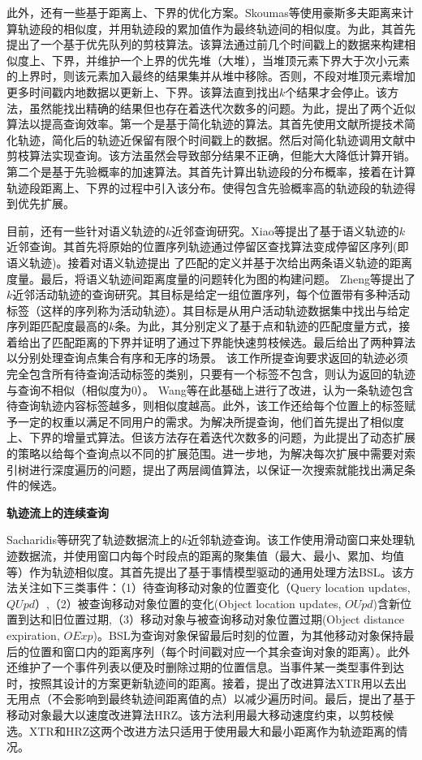 此外，还有一些基于距离上、下界的优化方案。Skoumas等使用豪斯多夫距离来计算轨迹段的相似度，并用轨迹段的累加值作为最终轨迹间的相似度\cite{Skoumas}。为此，其首先提出了一个基于优先队列的剪枝算法。该算法通过前几个时间戳上的数据来构建相似度上、下界，并维护一个上界的优先堆（大堆），当堆顶元素下界大于次小元素的上界时，则该元素加入最终的结果集并从堆中移除。否则，不段对堆顶元素增加更多时间戳内地数据以更新上、下界。该算法直到找出$k$个结果才会停止。该方法，虽然能找出精确的结果但也存在着迭代次数多的问题。为此，提出了两个近似算法以提高查询效率。第一个是基于简化轨迹的算法。其首先使用文献\cite{Zhao1997LINEAR}所提技术简化轨迹，简化后的轨迹近保留有限个时间戳上的数据。然后对简化轨迹调用文献\cite{Skoumas}中剪枝算法实现查询。该方法虽然会导致部分结果不正确，但能大大降低计算开销。第二个是基于先验概率的加速算法。其首先计算出轨迹段的分布概率，接着在计算轨迹段距离上、下界的过程中引入该分布。使得包含先验概率高的轨迹段的轨迹得到优先扩展。


目前，还有一些针对语义轨迹的$k$近邻查询研究\cite{Xiao,Kaiser,WangBCSSQ17}。Xiao等提出了基于语义轨迹的$k$近邻查询\cite{Xiao}。其首先将原始的位置序列轨迹通过停留区查找算法变成停留区序列(即语义轨迹)。接着对语义轨迹提出 了匹配的定义并基于次给出两条语义轨迹的距离度量。最后，将语义轨迹间距离度量的问题转化为图的构建问题。
Zheng等提出了$k$近邻活动轨迹的查询研究。其目标是给定一组位置序列，每个位置带有多种活动标签（这样的序列称为活动轨迹）\cite{Kaiser}。其目标是从用户活动轨迹数据集中找出与给定序列距匹配度最高的$k$条。为此，其分别定义了基于点和轨迹的匹配度量方式，接着给出了匹配距离的下界并证明了通过下界能快速剪枝候选。最后给出了两种算法以分别处理查询点集合有序和无序的场景。
该工作所提查询要求返回的轨迹必须完全包含所有待查询活动标签的类别，只要有一个标签不包含，则认为返回的轨迹与查询不相似（相似度为0）。
Wang等在此基础上进行了改进，认为一条轨迹包含待查询轨迹内容标签越多，则相似度越高\cite{WangBCSSQ17}。此外，该工作还给每个位置上的标签赋予一定的权重以满足不同用户的需求。为解决所提查询，他们首先提出了相似度上、下界的增量式算法。但该方法存在着迭代次数多的问题，为此提出了动态扩展的策略以给每个查询点以不同的扩展范围。进一步地，为解决每次扩展中需要对索引树进行深度遍历的问题，提出了两层阈值算法，以保证一次搜索就能找出满足条件的候选。

\textbf{轨迹流上的连续查询}

Sacharidis等研究了轨迹数据流上的$k$近邻轨迹查询\cite{SacharidisSS14}。该工作使用滑动窗口来处理轨迹数据流，并使用窗口内每个时段点的距离的聚集值（最大、最小、累加、均值等）作为轨迹相似度。其首先提出了基于事情模型驱动的通用处理方法BSL。该方法关注如下三类事件：（1）待查询移动对象的位置变化（Query location updates,$QUpd$）,（2）被查询移动对象位置的变化(Object location updates, $OUpd$)含新位置到达和旧位置过期,（3）移动对象与被查询移动对象位置过期(Object distance expiration, $OExp$)。BSL为查询对象保留最后时刻的位置，为其他移动对象保持最后的位置和窗口内的距离序列（每个时间戳对应一个其余查询对象的距离）。此外还维护了一个事件列表以便及时删除过期的位置信息。当事件某一类型事件到达时，按照其设计的方案更新轨迹间的距离。接着，提出了改进算法XTR用以去出无用点（不会影响到最终轨迹间距离值的点）以减少遍历时间。最后，提出了基于移动对象最大以速度改进算法HRZ。该方法利用最大移动速度约束，以剪枝候选。XTR和HRZ这两个改进方法只适用于使用最大和最小距离作为轨迹距离的情况。

